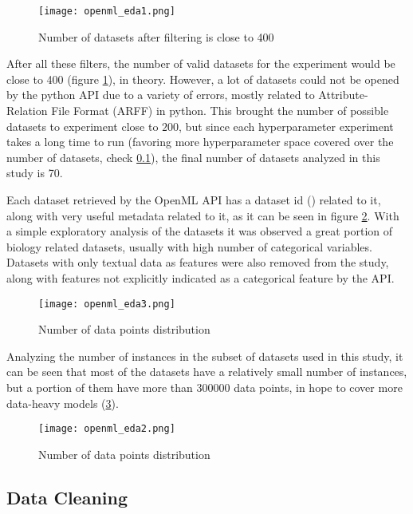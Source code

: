 \begin{figure}[!h]
    \centering
    \texttt{[image: openml\_eda1.png]} 
    \caption{Number of datasets after filtering is close to 400}
    \label{fig:openml-eda1}
\end{figure}

After all these filters, the number of valid datasets for the experiment would be close to 400 (figure \ref{fig:openml-eda1}), in theory. However, a lot of datasets could not be opened by the python API due to a variety of errors, mostly related to Attribute-Relation File Format (ARFF) in python. This brought the number of possible datasets to experiment close to $200$, but since each hyperparameter experiment takes a long time to run (favoring more hyperparameter space covered over the number of datasets, check \ref{}), the final number of datasets analyzed in this study is 70.


Each dataset retrieved by the OpenML API has a dataset id () related to it, along with very useful metadata related to it, as it can be seen in figure \ref{fig:openml-eda3}. With a simple exploratory analysis of the datasets it was observed a great portion of biology related datasets, usually with high number of categorical variables. Datasets with only textual data as features were also removed from the study, along with features not explicitly indicated as a categorical feature by the API.

\begin{figure}[!h]
    \centering
    \texttt{[image: openml\_eda3.png]} 
    \caption{Number of data points distribution}
    \label{fig:openml-eda3}
\end{figure}

Analyzing the number of instances in the subset of datasets used in this study, it can be seen that most of the datasets have a relatively small number of instances, but a portion of them have more than $300000$ data points, in hope to cover more data-heavy models (\ref{fig:openml-eda2}).

\begin{figure}[!h]
    \centering
    \texttt{[image: openml\_eda2.png]} 
    \caption{Number of data points distribution}
    \label{fig:openml-eda2}
\end{figure}

\newpage

\subsection{Data Cleaning}

